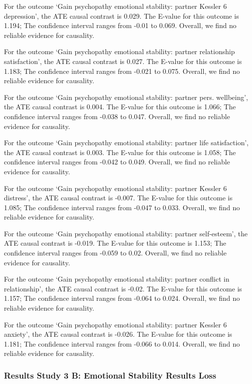 \documentclass[
  singlecolumn]{article}
\begin{document}
For the outcome `Gain psychopathy emotional stability: partner Kessler 6
depression', the ATE causal contrast is 0.029. The E-value for this
outcome is 1.194; The confidence interval ranges from -0.01 to 0.069.
Overall, we find no reliable evidence for causality.

For the outcome `Gain psychopathy emotional stability: partner
relationship satisfaction', the ATE causal contrast is 0.027. The
E-value for this outcome is 1.183; The confidence interval ranges from
-0.021 to 0.075. Overall, we find no reliable evidence for causality.

For the outcome `Gain psychopathy emotional stability: partner pers.
wellbeing', the ATE causal contrast is 0.004. The E-value for this
outcome is 1.066; The confidence interval ranges from -0.038 to 0.047.
Overall, we find no reliable evidence for causality.

For the outcome `Gain psychopathy emotional stability: partner life
satisfaction', the ATE causal contrast is 0.003. The E-value for this
outcome is 1.058; The confidence interval ranges from -0.042 to 0.049.
Overall, we find no reliable evidence for causality.

For the outcome `Gain psychopathy emotional stability: partner Kessler 6
distress', the ATE causal contrast is -0.007. The E-value for this
outcome is 1.085; The confidence interval ranges from -0.047 to 0.033.
Overall, we find no reliable evidence for causality.

For the outcome `Gain psychopathy emotional stability: partner
self-esteem', the ATE causal contrast is -0.019. The E-value for this
outcome is 1.153; The confidence interval ranges from -0.059 to 0.02.
Overall, we find no reliable evidence for causality.

For the outcome `Gain psychopathy emotional stability: partner conflict
in relationship', the ATE causal contrast is -0.02. The E-value for this
outcome is 1.157; The confidence interval ranges from -0.064 to 0.024.
Overall, we find no reliable evidence for causality.

For the outcome `Gain psychopathy emotional stability: partner Kessler 6
anxiety', the ATE causal contrast is -0.026. The E-value for this
outcome is 1.181; The confidence interval ranges from -0.066 to 0.014.
Overall, we find no reliable evidence for causality.

\subsubsection{Results Study 3 B: Emotional Stability Results
Loss}\label{results-study-3-b-emotional-stability-results-loss}
\end{document}
